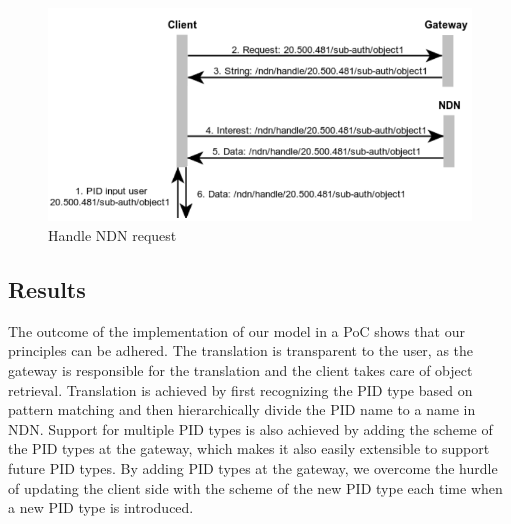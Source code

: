 \begin{figure}[H]
\includegraphics[scale=0.75]{Images/ndn_req.png}
\caption{Handle NDN request}
\label{fig:seq_ndn}
\end{figure}

\subsection{Results}
The outcome of the implementation of our model in a PoC shows that our principles can be adhered.
The translation is transparent to the user, as the gateway is responsible for the translation and the client takes care of object retrieval. Translation is achieved by first recognizing the PID type based on pattern matching and then hierarchically divide the PID name to a name in NDN. Support for multiple PID types is also achieved by adding the scheme of the PID types at the gateway, which makes it also easily extensible to support future PID types. By adding PID types at the gateway, we overcome the hurdle of updating the client side with the scheme of the new PID type each time when a new PID type is introduced.